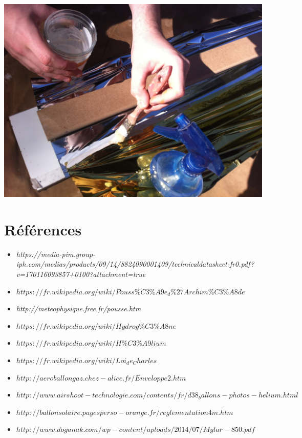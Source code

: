 \documentclass[a4paper,11pt]{article}
\begin{document}
\begin{center}
	\includegraphics[width=15cm]{../Images/assen_3.JPG}
\end{center}

\section{Références}
\begin{itemize}
  \item \emph{https://media-pim.group-iph.com/medias/products/09/14/8824090001409/technicaldatasheet-fr0.pdf?v=170116093857+0100?attachment=true}
  \item \emph{$https://fr.wikipedia.org/wiki/Pouss\%C3\%A9e_d\%27Archim\%C3\%A8de$}
  \item \emph{http://meteophysique.free.fr/pousse.htm}
  \item \emph{$https://fr.wikipedia.org/wiki/Hydrog\%C3\%A8ne$}
  \item \emph{$https://fr.wikipedia.org/wiki/H\%C3\%A9lium$}
  \item \emph{$https://fr.wikipedia.org/wiki/Loi_de_Charles$}
  \item \emph{$http://aeroballongaz.chez-alice.fr/Enveloppe2.htm$}
  \item \emph{$http://www.airshoot-technologie.com/contents/fr/d38_ballons-photos-helium.html$}
  \item \emph{$http://ballonsolaire.pagesperso-orange.fr/reglementation4m.htm$}
  \item \emph{$http://www.doganak.com/wp-content/uploads/2014/07/Mylar-850.pdf$}
\end{itemize}
\end{document}
